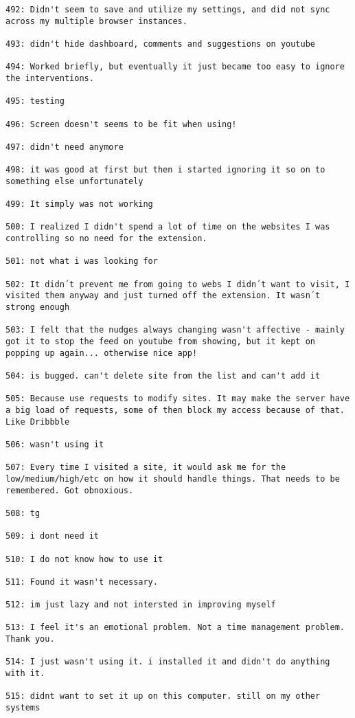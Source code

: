 \begin{lstlisting}[breaklines]
492: Didn't seem to save and utilize my settings, and did not sync across my multiple browser instances.

493: didn't hide dashboard, comments and suggestions on youtube

494: Worked briefly, but eventually it just became too easy to ignore the interventions.

495: testing

496: Screen doesn't seems to be fit when using!

497: didn't need anymore

498: it was good at first but then i started ignoring it so on to something else unfortunately

499: It simply was not working

500: I realized I didn't spend a lot of time on the websites I was controlling so no need for the extension.

501: not what i was looking for

502: It didn´t prevent me from going to webs I didn´t want to visit, I visited them anyway and just turned off the extension. It wasn´t strong enough

503: I felt that the nudges always changing wasn't affective - mainly got it to stop the feed on youtube from showing, but it kept on popping up again... otherwise nice app!

504: is bugged. can't delete site from the list and can't add it

505: Because use requests to modify sites. It may make the server have a big load of requests, some of then block my access because of that. Like Dribbble

506: wasn't using it

507: Every time I visited a site, it would ask me for the low/medium/high/etc on how it should handle things. That needs to be remembered. Got obnoxious.

508: tg

509: i dont need it

510: I do not know how to use it

511: Found it wasn't necessary.

512: im just lazy and not intersted in improving myself

513: I feel it's an emotional problem. Not a time management problem. Thank you.

514: I just wasn't using it. i installed it and didn't do anything with it.

515: didnt want to set it up on this computer. still on my other systems


\end{lstlisting}
